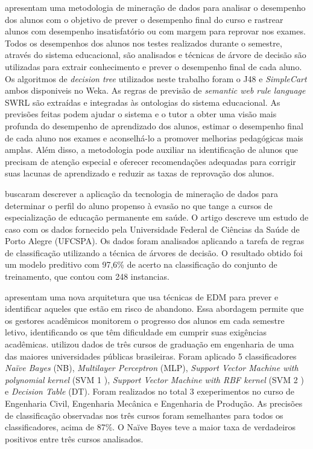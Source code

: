 \documentclass[ti]{texufpel} %
\begin{document}
\citet{grivokostopoulou2014utilizing} apresentam uma metodologia de mineração de dados para analisar o desempenho dos alunos com o objetivo de prever o desempenho final do curso e rastrear alunos com desempenho insatisfatório ou com margem para reprovar nos exames. Todos os desempenhos dos alunos nos testes realizados durante o semestre, através do sistema educacional, são analisados e técnicas de árvore de decisão são utilizadas para extrair conhecimento e prever o desempenho final de cada aluno. Os algoritmos de \textit{decision tree} utilizados neste trabalho foram o J48 e \textit{SimpleCart} ambos disponiveis no Weka. As regras de previsão de \textit{semantic web rule language} SWRL são extraídas e integradas às ontologias do sistema educacional. As previsões feitas podem ajudar o sistema e o tutor a obter uma visão mais profunda do desempenho de aprendizado dos alunos, estimar o desempenho final de cada aluno nos exames e aconselhá-lo a promover melhorias pedagógicas mais amplas. Além disso, a metodologia pode auxiliar na identificação de alunos que precisam de atenção especial e oferecer recomendações adequadas para corrigir suas lacunas de aprendizado e reduzir as taxas de reprovação dos alunos.

\citet{da2014minerando} buscaram descrever a aplicação da tecnologia de mineração de dados para determinar o perfil do aluno propenso à evasão no que tange a cursos de especialização de educação permanente em saúde. O artigo descreve um estudo de caso com os dados fornecido pela Universidade Federal de Ciências da Saúde de Porto Alegre (UFCSPA). Os dados foram analisados aplicando a tarefa de regras de classificação utilizando a técnica de árvores de decisão. O resultado obtido foi um modelo preditivo com 97,6\% de acerto na classificação do conjunto de treinamento, que contou com 248 instancias.

\citet{manhaes2014wave} apresentam uma nova arquitetura que usa técnicas de EDM para prever e identificar aqueles que estão em risco de abandono. Essa abordagem permite que os gestores acadêmicos monitorem o progresso dos alunos em cada semestre letivo, identificando os que têm dificuldade em cumprir suas exigências acadêmicas. utilizou dados de três cursos de graduação em engenharia de uma das maiores universidades públicas brasileiras. Foram aplicado 5 classificadores \textit{Naïve Bayes} (NB), \textit{Multilayer Perceptron} (MLP), \textit{Support Vector Machine with polynomial kernel} (SVM 1 ), \textit{Support Vector Machine with RBF kernel} (SVM 2 ) e \textit{Decision Table} (DT). Foram realizados no total 3 exeperimentos no curso de Engenharia Civil, Engenharia Mecânica e Engenharia de Produção. As precisões de classificação observadas nos três cursos foram semelhantes para todos os classificadores, acima de 87\%. O Naïve Bayes teve a maior taxa de verdadeiros positivos entre três cursos analisados.
\end{document}
